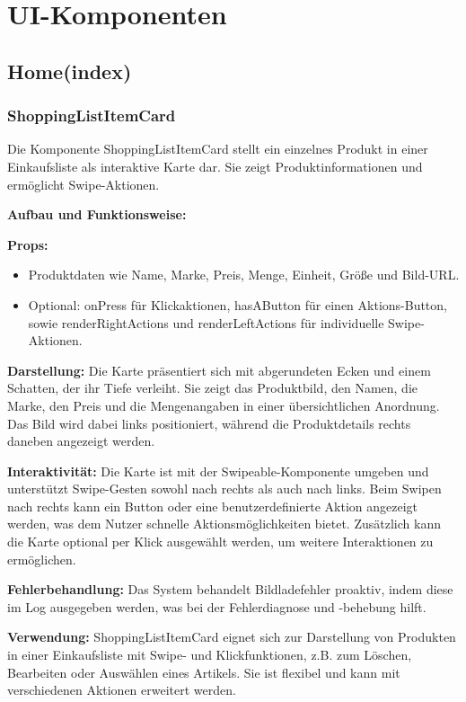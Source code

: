 \documentclass[12pt, a4paper]{report} %
\begin{document}
\section{UI-Komponenten}
\label{sec:ui_komponenten}

\subsection{Home(index)}

\subsubsection{ShoppingListItemCard}
Die Komponente ShoppingListItemCard stellt ein einzelnes Produkt in einer Einkaufsliste als interaktive Karte dar. Sie zeigt Produktinformationen und ermöglicht Swipe-Aktionen.

\noindent\textbf{Aufbau und Funktionsweise:}

\textbf{Props:}
\begin{itemize}
    \item Produktdaten wie Name, Marke, Preis, Menge, Einheit, Größe und Bild-URL.
    \item Optional: onPress für Klickaktionen, hasAButton für einen Aktions-Button, sowie renderRightActions und renderLeftActions für individuelle Swipe-Aktionen.
\end{itemize}

\textbf{Darstellung:}
Die Karte präsentiert sich mit abgerundeten Ecken und einem Schatten, der ihr Tiefe verleiht. Sie zeigt das Produktbild, den Namen, die Marke, den Preis und die Mengenangaben in einer übersichtlichen Anordnung. Das Bild wird dabei links positioniert, während die Produktdetails rechts daneben angezeigt werden.

\textbf{Interaktivität:}
Die Karte ist mit der Swipeable-Komponente umgeben und unterstützt Swipe-Gesten sowohl nach rechts als auch nach links. Beim Swipen nach rechts kann ein Button oder eine benutzerdefinierte Aktion angezeigt werden, was dem Nutzer schnelle Aktionsmöglichkeiten bietet. Zusätzlich kann die Karte optional per Klick ausgewählt werden, um weitere Interaktionen zu ermöglichen.

\textbf{Fehlerbehandlung:}
Das System behandelt Bildladefehler proaktiv, indem diese im Log ausgegeben werden, was bei der Fehlerdiagnose und -behebung hilft.

\noindent\textbf{Verwendung:} ShoppingListItemCard eignet sich zur Darstellung von Produkten in einer Einkaufsliste mit Swipe- und Klickfunktionen, z.B. zum Löschen, Bearbeiten oder Auswählen eines Artikels. Sie ist flexibel und kann mit verschiedenen Aktionen erweitert werden.
\end{document}
